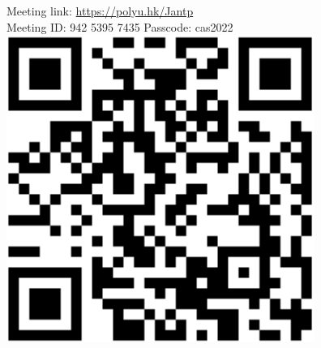 \documentclass[
	openany, %
	parskip=full, %
	12pt, %
	a4paper, %
]{conferencebooklet} %
\begin{document}
\begin{center}
Meeting link: \url{https://polyu.hk/Jantp}\\
\vspace{0.5cm}
Meeting ID: 942 5395 7435 \quad Passcode: cas2022\\
\vspace{1cm}
\includegraphics[scale=0.5]{qrcode.png}

\end{center}




\setcounter{page}{0}








\end{document}
